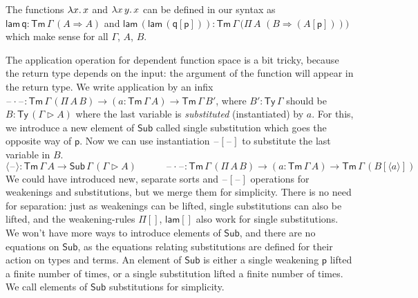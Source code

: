 \documentclass[submission,copyright,creativecommons]{eptcs}
\newcommand{\ra}{\rightarrow}
\newcommand{\Ra}{\Rightarrow}
\newcommand{\Ty}{\mathsf{Ty}}
\newcommand{\Tm}{\mathsf{Tm}}
\newcommand{\Sub}{\mathsf{Sub}}
\newcommand{\p}{\mathsf{p}}
\newcommand{\q}{\mathsf{q}}
\newcommand{\ext}{\mathop{\triangleright}}
\newcommand{\lam}{\mathsf{lam}}
\newcommand{\blank}{\mathord{\hspace{1pt}\text{--}\hspace{1pt}}} %
\begin{document}
The functions $\lambda x\ldotp x$ and $\lambda x\,y\ldotp x$ can be defined in our
syntax as $\lam\,\q : \Tm\,\Gamma\,(A\Ra A)$ and
$\lam\,(\lam\,(\q[\p])) :
\Tm\,\Gamma\,\big(\Pi\,A$ $(B\Ra(A[\p]))\big)$ which make sense for all
$\Gamma$, $A$, $B$.

The application operation for dependent function space is a bit
tricky, because the return type depends on the input: the argument of
the function will appear in the return type. We write application by
an infix $\blank\cdot\blank :
\Tm\,\Gamma\,(\Pi\,A\,B)\ra(a:\Tm\,\Gamma\,A)\ra\Tm\,\Gamma\,B'$,
where $B' : \Ty\,\Gamma$ should be $B:\Ty\,(\Gamma\ext A)$ where the
last variable is \emph{substituted} (instantiated) by $a$. For this,
we introduce a new element of $\Sub$ called single substitution which
goes the opposite way of $\p$. Now we can use instantiation
$\blank[\blank]$ to substitute the last variable in $B$.
\[
\langle\blank\rangle : \Tm\,\Gamma\,A\ra\Sub\,\Gamma\,(\Gamma\ext A) \hspace{3em}
\blank\cdot\blank : \Tm\,\Gamma\,(\Pi\,A\,B)\ra(a:\Tm\,\Gamma\,A)\ra\Tm\,\Gamma\,(B[\langle a\rangle])
\]
We could have introduced new, separate sorts and $\blank[\blank]$
operations for weakenings and substitutions, but we merge them for
simplicity. There is no need for separation: just as weakenings can be
lifted, single substitutions can also be lifted, and the
weakening-rules $\Pi[]$, $\lam[]$ also work for single
substitutions. We won't have more ways to introduce elements of
$\Sub$, and there are no equations on $\Sub$,
as the equations relating substitutions are defined for their action
on types and terms. An element of $\Sub$ is
either a single weakening $\p$ lifted a finite number of times, or a single
substitution lifted a finite number of times. We call elements of $\Sub$
substitutions for simplicity.
\end{document}
